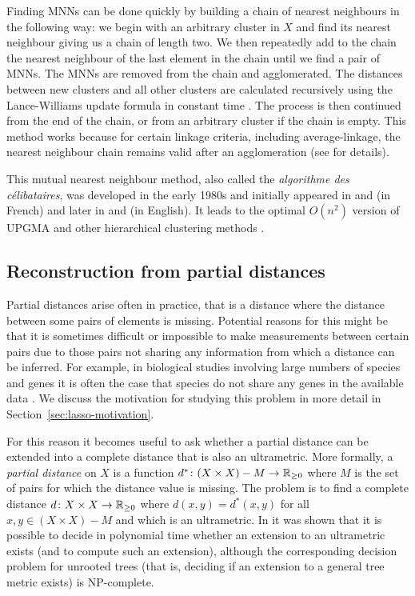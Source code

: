 Finding MNNs can be done quickly by building a chain of nearest neighbours in
the following way: we begin with an arbitrary cluster in $X$ and find its
nearest neighbour giving us a chain of length two.  We then repeatedly add to
the chain the nearest neighbour of the last element in the chain until we find
a pair of MNNs.  The MNNs are removed from the chain and agglomerated.  The
distances between new clusters and all other clusters are calculated
recursively using the Lance-Williams update formula in constant time
\cite{lance66theory}.  The process is then continued from the end of the
chain, or from an arbitrary cluster if the chain is empty.  This method works
because for certain linkage criteria, including average-linkage, the nearest
neighbour chain remains valid after an agglomeration (see
\cite{gronau2007optimal} for details).

This mutual nearest neighbour method, also called the \textit{algorithme des
  célibataires}, was developed in the early 1980s and initially appeared in
\cite{de1980classification} and \cite{juan1982programme} (in French) and later
in \cite{murtagh1983survey} and \cite{murtagh1984complexities} (in English).
It leads to the optimal $O(n^2)$ version of UPGMA and other hierarchical
clustering methods \cite{gronau2007optimal}.

\subsection{Reconstruction from partial distances}
\label{sec:constr-from-part}

Partial distances arise often in practice, that is a distance where the
distance between some pairs of elements is missing.  Potential reasons for
this might be that it is sometimes difficult or impossible to make
measurements between certain pairs due to those pairs not sharing any
information from which a distance can be inferred.  For example, in biological
studies involving large numbers of species and genes it is often the case that
species do not share any genes in the available data
\cite{criscuolo2008fastnj}.  We discuss the motivation for studying this
problem in more detail in Section~\ref{sec:lasso-motivation}.

For this reason it becomes useful to ask whether a partial distance can be
extended into a complete distance that is also an ultrametric.  More formally,
a \textit{partial distance} on $X$ is a function $d^* \colon (X \times X) - M
\to {\mathbb R}_{\geq 0}$ where $M$ is the set of pairs for which the distance value is
missing.  The problem is to find a complete distance $d \colon X \times X \to
{\mathbb R}_{\geq 0}$ where $d(x,y) = d^*(x,y)$ for all $x,y \in (X \times X) - M$ and which
is an ultrametric.  In \cite{farach1995robust} it was shown that it is
possible to decide in polynomial time whether an extension to an ultrametric
exists (and to compute such an extension), although the corresponding decision
problem for unrooted trees (that is, deciding if an extension to a general
tree metric exists) is NP-complete.

